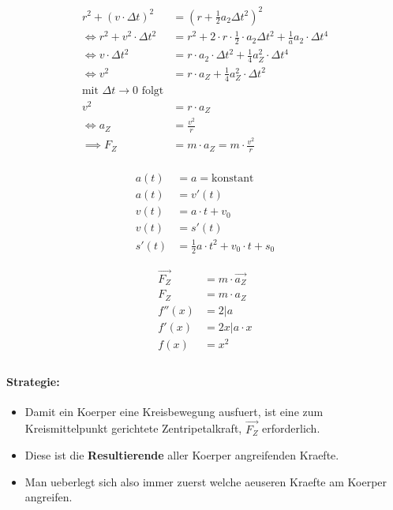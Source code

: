 \documentclass{report}
\begin{document}
\begin{multicols}{2}
\begin{align*}
  r^2 + (v\cdot \Delta t)^2 &= (r+\frac{1}{2}a_2\Delta t^2)^2\\
  \Leftrightarrow r^2+v^2 \cdot \Delta t^2 &=r^2+2\cdot r \cdot \frac{1}{2} \cdot a_2 \Delta t^2+\frac{1}{a}a_2 \cdot \Delta t^4\\
  \Leftrightarrow v\cdot \Delta t^2&= r\cdot a_2 \cdot \Delta t^2 + \frac{1}{4} a_Z^2 \cdot \Delta t^4\\
  \Leftrightarrow v^2 &=r\cdot a_Z + \frac{1}{4}a_Z^2 \cdot \Delta t^2\\
  \text{mit $\Delta t \to 0$ folgt}&\\
  v^2&=r\cdot a_Z\\
  \Leftrightarrow a_Z &=\frac{v^2}{r}\\
  \implies F_Z &=m\cdot a_Z = m\cdot \frac{v^2}{r}\\
\end{align*}

\begin{align*}
  a(t)&=a=\text{konstant}\\
  a(t)&=v'(t)\\
  v(t)&=a\cdot t+v_0\\
  v(t)&=s'(t)\\
  s'(t)&=\frac{1}{2}a\cdot t^2+v_0\cdot t + s_0
\end{align*}

\begin{align*}
  \vec{F_Z}&=m\cdot \vec{a_Z}\\
  F_Z&=m\cdot a_Z\\
  f''(x)&=2 | a\\
  f'(x)&=2x | a\cdot x \\
  f(x)&=x^2\\
\end{align*}
\end{multicols}

\clearpage

\paragraph{Strategie:}
\begin{itemize}
  \item Damit ein Koerper eine Kreisbewegung ausfuert, ist eine zum
    Kreismittelpunkt gerichtete Zentripetalkraft, $\vec{F_Z}$ erforderlich. 
  \item Diese ist die \textbf{Resultierende} aller Koerper angreifenden Kraefte.
  \item Man ueberlegt sich also immer zuerst welche aeuseren Kraefte am Koerper angreifen.
\end{itemize}
\end{document}
